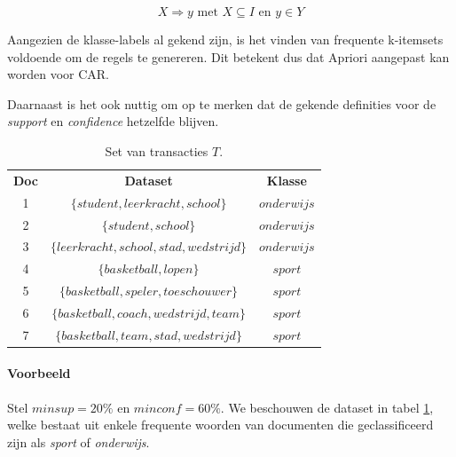 \begin{equation}
X \Rightarrow y \textrm{ met } X \subseteq I \textrm{ en } y \in Y
\end{equation}

Aangezien de klasse-labels al gekend zijn, is het vinden van frequente k-itemsets voldoende om de regels te genereren. Dit betekent dus dat Apriori aangepast kan worden voor CAR. 

Daarnaast is het ook nuttig om op te merken dat de gekende definities voor de \emph{support} en \emph{confidence} hetzelfde blijven.
%
\newpage
\begin{table}
\centering
\caption{Set van transacties $T$.}
\label{tabel:7-transacties}
\begin{tabular}{c|c|c}
\textbf{Doc} & \textbf{Dataset} & \textbf{Klasse} \\
1 & $\{student, leerkracht, school\}$ & $onderwijs$ \\
2 & $\{student, school\}$ & $onderwijs$ \\
3 & $\{leerkracht, school, stad, wedstrijd\}$ & $onderwijs$\\
4 & $\{basketball, lopen\}$ & $sport$ \\
5 & $\{basketball, speler, toeschouwer\}$ & $sport$\\
6 & $\{basketball, coach, wedstrijd, team\}$ & $sport$\\
7 & $\{basketball, team, stad, wedstrijd\}$ & $sport$
\end{tabular}
\end{table}
%
\paragraph{Voorbeeld}
Stel $minsup = 20\%$ en $minconf = 60\%$. We beschouwen de dataset in tabel \ref{tabel:7-transacties}, welke bestaat uit enkele frequente woorden van documenten die geclassificeerd zijn als \emph{sport} of \emph{onderwijs}.

